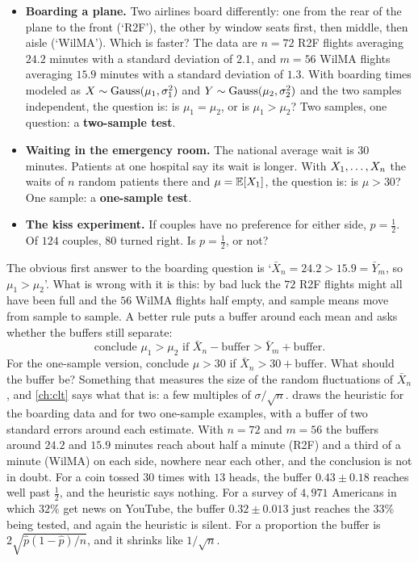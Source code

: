 \begin{itemize}
\item \textbf{Boarding a plane.} Two airlines board differently: one from the rear of the plane to the front (`R2F'), the other by window seats first, then middle, then aisle (`WilMA').
Which is faster?
The data are $n = 72$ R2F flights averaging $24.2$ minutes with a standard deviation of $2.1$, and $m = 56$ WilMA flights averaging $15.9$ minutes with a standard deviation of $1.3$.
With boarding times modeled as $X \sim \text{Gauss}(\mu_1, \sigma_1^2)$ and $Y \sim \text{Gauss}(\mu_2, \sigma_2^2)$ and the two samples independent, the question is: is $\mu_1 = \mu_2$, or is $\mu_1 > \mu_2$?
Two samples, one question: a \textbf{two-sample test}.
\item \textbf{Waiting in the emergency room.} The national average wait is $30$ minutes.
Patients at one hospital say its wait is longer.
With $X_1, \ldots, X_n$ the waits of $n$ random patients there and $\mu = \operatorname*{\mathbb{E}}[X_1]$, the question is: is $\mu > 30$?
One sample: a \textbf{one-sample test}.
\item \textbf{The kiss experiment.} If couples have no preference for either side, $p = \frac12$.
Of $124$ couples, $80$ turned right.
Is $p = \frac12$, or not?
\end{itemize}

The obvious first answer to the boarding question is `$\bar{X}_n = 24.2 > 15.9 = \bar{Y}_m$, so $\mu_1 > \mu_2$'.
What is wrong with it is this: by bad luck the $72$ R2F flights might all have been full and the $56$ WilMA flights half empty, and sample means move from sample to sample.
A better rule puts a buffer around each mean and asks whether the buffers still separate:
\[
\text{conclude } \mu_1 > \mu_2 \text{ if } \bar{X}_n - \text{buffer} > \bar{Y}_m + \text{buffer}.
\]
For the one-sample version, conclude $\mu > 30$ if $\bar{X}_n > 30 + \text{buffer}$.
What should the buffer be?
Something that measures the size of the random fluctuations of $\bar{X}_n$, and \cref{ch:clt} says what that is: a few multiples of $\sigma/\sqrt{n}$.
 draws the heuristic for the boarding data and for two one-sample examples, with a buffer of two standard errors around each estimate.
With $n = 72$ and $m = 56$ the buffers around $24.2$ and $15.9$ minutes reach about half a minute (R2F) and a third of a minute (WilMA) on each side, nowhere near each other, and the conclusion is not in doubt.
For a coin tossed $30$ times with $13$ heads, the buffer $0.43 \pm 0.18$ reaches well past $\frac12$, and the heuristic says nothing.
For a survey of $4{,}971$ Americans in which $32\%$ get news on YouTube, the buffer $0.32 \pm 0.013$ just reaches the $33\%$ being tested, and again the heuristic is silent.
For a proportion the buffer is $2\sqrt{\hat{p}(1-\hat{p})/n}$, and it shrinks like $1/\sqrt{n}$.

